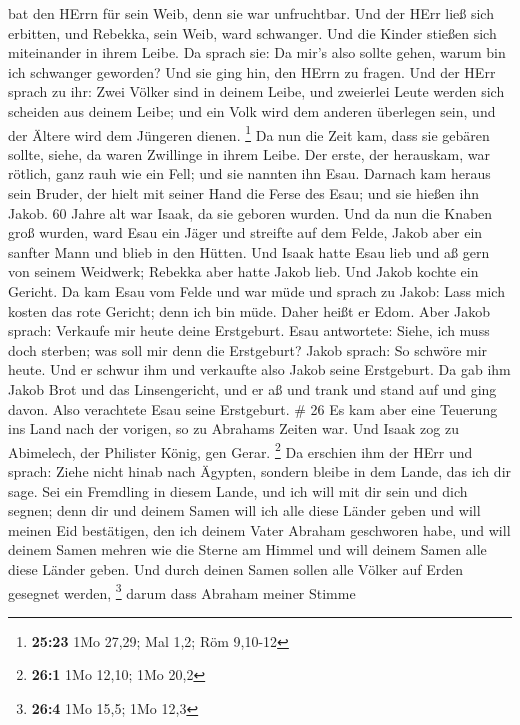bat den HErrn für sein Weib, denn sie war unfruchtbar. Und der HErr ließ
sich erbitten, und Rebekka, sein Weib, ward schwanger.  Und
die Kinder stießen sich miteinander in ihrem Leibe. Da sprach sie: Da
mir's also sollte gehen, warum bin ich schwanger geworden? Und sie ging
hin, den HErrn zu fragen.  Und der HErr sprach zu ihr: Zwei
Völker sind in deinem Leibe, und zweierlei Leute werden sich scheiden
aus deinem Leibe; und ein Volk wird dem anderen überlegen sein, und der
Ältere wird dem Jüngeren dienen. \footnote{\textbf{25:23} 1Mo 27,29; Mal
  1,2; Röm 9,10-12}  Da nun die Zeit kam, dass sie gebären
sollte, siehe, da waren Zwillinge in ihrem Leibe.  Der
erste, der herauskam, war rötlich, ganz rauh wie ein Fell; und sie
nannten ihn Esau.  Darnach kam heraus sein Bruder, der
hielt mit seiner Hand die Ferse des Esau; und sie hießen ihn Jakob. 60
Jahre alt war Isaak, da sie geboren wurden.  Und da nun die
Knaben groß wurden, ward Esau ein Jäger und streifte auf dem Felde,
Jakob aber ein sanfter Mann und blieb in den Hütten.  Und
Isaak hatte Esau lieb und aß gern von seinem Weidwerk; Rebekka aber
hatte Jakob lieb.  Und Jakob kochte ein Gericht. Da kam
Esau vom Felde und war müde  und sprach zu Jakob: Lass mich
kosten das rote Gericht; denn ich bin müde. Daher heißt er Edom.
 Aber Jakob sprach: Verkaufe mir heute deine Erstgeburt.
 Esau antwortete: Siehe, ich muss doch sterben; was soll
mir denn die Erstgeburt?  Jakob sprach: So schwöre mir
heute. Und er schwur ihm und verkaufte also Jakob seine Erstgeburt.
 Da gab ihm Jakob Brot und das Linsengericht, und er aß und
trank und stand auf und ging davon. Also verachtete Esau seine
Erstgeburt. \# 26  Es kam aber eine Teuerung ins Land nach
der vorigen, so zu Abrahams Zeiten war. Und Isaak zog zu Abimelech, der
Philister König, gen Gerar. \footnote{\textbf{26:1} 1Mo 12,10; 1Mo 20,2}
 Da erschien ihm der HErr und sprach: Ziehe nicht hinab nach
Ägypten, sondern bleibe in dem Lande, das ich dir sage.  Sei
ein Fremdling in diesem Lande, und ich will mit dir sein und dich
segnen; denn dir und deinem Samen will ich alle diese Länder geben und
will meinen Eid bestätigen, den ich deinem Vater Abraham geschworen
habe,  und will deinem Samen mehren wie die Sterne am Himmel
und will deinem Samen alle diese Länder geben. Und durch deinen Samen
sollen alle Völker auf Erden gesegnet werden, \footnote{\textbf{26:4}
  1Mo 15,5; 1Mo 12,3}  darum dass Abraham meiner Stimme
